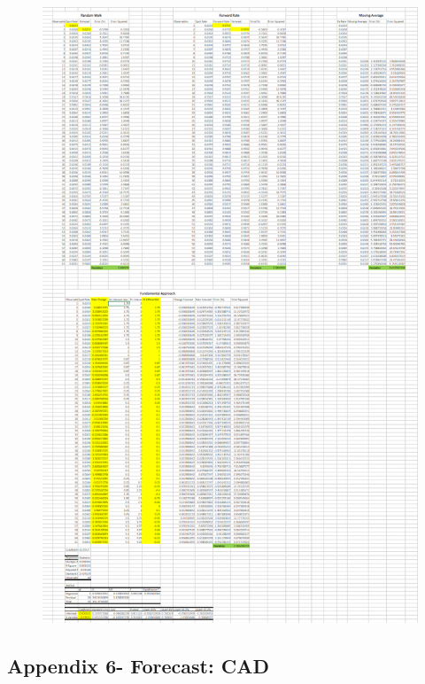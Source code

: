 \documentclass{article}
\let\Oldsubsection\subsection
\renewcommand{\subsection}{\FloatBarrier\Oldsubsection}
\begin{document}
\begin{figure}[h!]
    \centering
    \includegraphics[scale=0.5]{forecasts/EUR.png}
\end{figure}

\break

\subsection*{Appendix 6- Forecast: CAD}
\end{document}
